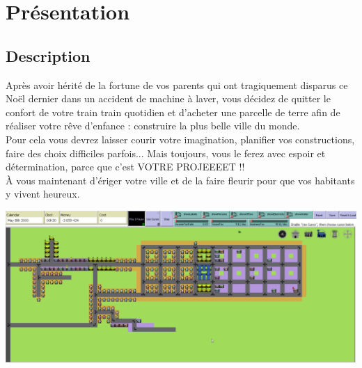 \documentclass[11pt]{report}
\begin{document}
\chapter{Présentation}

\section{Description}
Après avoir hérité de la fortune de vos parents qui ont tragiquement disparus ce Noël dernier dans un accident de machine à laver, vous décidez de quitter le confort de votre train train quotidien et d'acheter une parcelle de terre afin de réaliser votre rêve d'enfance : construire la plus belle ville du monde.\\
Pour cela vous devrez laisser courir votre imagination, planifier vos constructions, faire des choix difficiles parfois... Mais toujours, vous le ferez avec espoir et détermination, parce que c'est VOTRE PROJEEEET !!\\
À vous maintenant d'ériger votre ville et de la faire fleurir pour que vos habitants y vivent heureux.
\begin{center}
	\includegraphics[width=\textwidth]{intro}
\end{center}


\newpage
\end{document}
